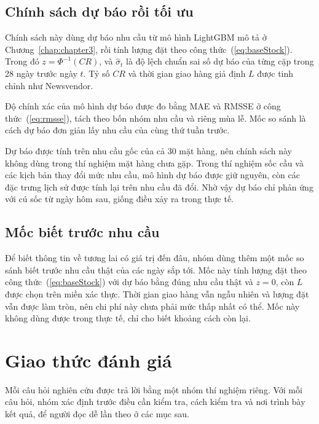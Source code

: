 \subsection{Chính sách dự báo rồi tối ưu}
\label{subsec:baselineDuBao}

Chính sách này dùng dự báo nhu cầu từ mô hình LightGBM mô tả ở Chương~\ref{chap:chapter3}, rồi tính lượng đặt theo công thức~(\ref{eq:baseStock}). Trong đó $z = \Phi^{-1}(CR)$, và $\hat{\sigma}_t$ là độ lệch chuẩn sai số dự báo của từng cặp trong 28 ngày trước ngày $t$. Tỷ số $CR$ và thời gian giao hàng giả định $L$ được tinh chỉnh như Newsvendor.

Độ chính xác của mô hình dự báo được đo bằng MAE và RMSSE ở công thức~(\ref{eq:rmsse}), tách theo bốn nhóm nhu cầu và riêng mùa lễ. Mốc so sánh là cách dự báo đơn giản lấy nhu cầu của cùng thứ tuần trước.

Dự báo được tính trên nhu cầu gốc của cả 30 mặt hàng, nên chính sách này không dùng trong thí nghiệm mặt hàng chưa gặp. Trong thí nghiệm sốc cầu và các kịch bản thay đổi mức nhu cầu, mô hình dự báo được giữ nguyên, còn các đặc trưng lịch sử được tính lại trên nhu cầu đã đổi. Nhờ vậy dự báo chỉ phản ứng với cú sốc từ ngày hôm sau, giống điều xảy ra trong thực tế.

\subsection{Mốc biết trước nhu cầu}
\label{subsec:mocBietTruoc}

Để biết thông tin về tương lai có giá trị đến đâu, nhóm dùng thêm một mốc so sánh biết trước nhu cầu thật của các ngày sắp tới. Mốc này tính lượng đặt theo công thức~(\ref{eq:baseStock}) với dự báo bằng đúng nhu cầu thật và $z = 0$, còn $L$ được chọn trên miền xác thực. Thời gian giao hàng vẫn ngẫu nhiên và lượng đặt vẫn được làm tròn, nên chi phí này chưa phải mức thấp nhất có thể. Mốc này không dùng được trong thực tế, chỉ cho biết khoảng cách còn lại.

\section{Giao thức đánh giá}
\label{sec:giaoThuc}

Mỗi câu hỏi nghiên cứu được trả lời bằng một nhóm thí nghiệm riêng. Với mỗi câu hỏi, nhóm xác định trước điều cần kiểm tra, cách kiểm tra và nơi trình bày kết quả, để người đọc dễ lần theo ở các mục sau.

